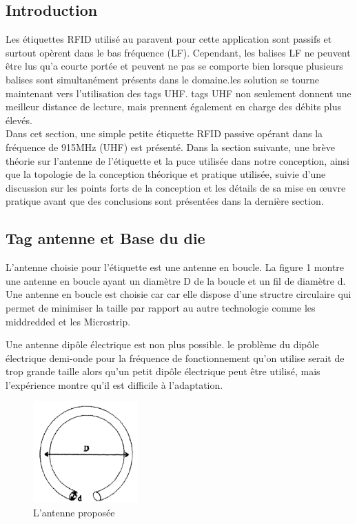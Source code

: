 \documentclass[11pt, a4paper, twoside]{book}
\begin{document}
\subsection{Introduction}
Les étiquettes RFID utilisé au paravent pour cette application sont passifs et surtout opèrent dans le bas fréquence (LF). Cependant, les balises LF ne peuvent être lus qu'a courte portée et peuvent ne pas se comporte bien lorsque plusieurs balises sont simultanément présents dans le domaine.les solution se tourne maintenant vers l'utilisation des tags UHF. tags UHF non seulement donnent une meilleur distance de lecture, mais prennent également en charge des débits plus élevés. \\

Dans cet section, une simple petite étiquette RFID passive opérant dans la fréquence de 915MHz (UHF) est présenté. Dans la section suivante, une brève théorie  sur l'antenne de l'étiquette et la puce utilisée dans notre conception, ainsi que la topologie de la conception théorique et pratique utilisée, suivie d'une discussion sur les points forts de la conception et les détails de sa mise en œuvre pratique avant que des conclusions sont présentées dans la dernière section.
\subsection{Tag antenne et Base du die}
L'antenne choisie pour l'étiquette  est une antenne en boucle. La figure 1 montre une antenne en boucle ayant un diamètre D de la boucle et un fil de diamètre d. Une antenne en boucle est choisie car car elle dispose d'une structre circulaire qui permet de minimiser la taille par rapport au autre technologie comme les middredded et les Microstrip. 

Une antenne dipôle électrique est  non plus possible. le problème du dipôle électrique  demi-onde pour la fréquence de fonctionnement qu'on utilise serait de trop grande taille alors qu'un  petit dipôle électrique peut être utilisé, mais l'expérience montre qu'il est difficile à l'adaptation.
\begin{figure}[H]
\centering
\includegraphics[width=4cm]{cla}
\caption{L'antenne proposée}
\end{figure}
\end{document}
